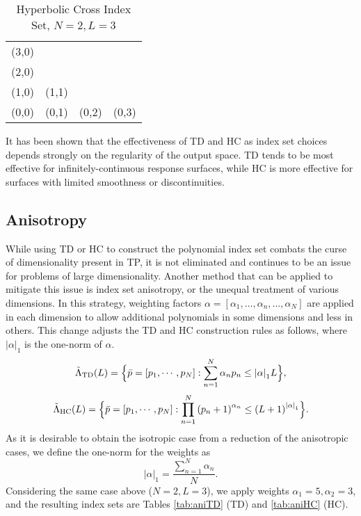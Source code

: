 \begin{table}[h]
  \centering
  \begin{tabular}{c c c c}
    (3,0) &       &       &       \\
    (2,0) &       &       &       \\
    (1,0) & (1,1) &       &       \\
    (0,0) & (0,1) & (0,2) & (0,3)
  \end{tabular}
  \caption{Hyperbolic Cross Index Set, $N=2,L=3$}
  \label{tab:HC}
\end{table}

It has been shown that the effectiveness of TD and HC as index set choices depends strongly on the regularity
of the output space\cite{hctd}.  TD tends to be most effective for infinitely-continuous response surfaces,
while HC is more effective for surfaces with limited smoothness or discontinuities.

\subsection{Anisotropy}
While using TD or HC to construct the polynomial index set combats the curse of dimensionality present in TP,
it is not eliminated and continues to be an issue for problems of large dimensionality.  Another method that can
be applied to mitigate this issue is index set anisotropy, or the unequal treatment of various dimensions.
In this strategy, weighting factors $\alpha=[\alpha_1,\ldots,\alpha_n,\ldots,\alpha_N]$ are applied in each
dimension to allow additional polynomials in some dimensions and less in others.  This change adjusts the TD
and HC construction rules as follows, where $|\alpha|_1$ is the one-norm of $\alpha$.
\begin{equation}
  \tilde\Lambda_\text{TD}(L)=\Big\{\bar p=[p_1,\cdots,p_N]:\sum_{n=1}^N \alpha_n p_n \leq \qty|\mathbf{\alpha}|_1 L
\Big\},
\end{equation}
\begin{equation}
  \tilde\Lambda_\text{HC}(L)=\Big\{\bar p=[p_1,\cdots,p_N]:\prod_{n=1}^N \qty(p_n+1)^{\alpha_n} \leq
  \qty(L+1)^{\qty|\mathbf{\alpha}|_1} \Big\}.
\end{equation}
As it is desirable to obtain the isotropic case from a reduction of the anisotropic cases, we define the
one-norm for the weights as
\begin{equation}
  |\alpha|_1 = \frac{\sum_{n=1}^N \alpha_n}{N}.
\end{equation}
Considering the same case above ($N=2,L=3$), we apply weights $\alpha_1=5,\alpha_2=3$, and the resulting index
sets are Tables \ref{tab:aniTD} (TD) and \ref{tab:aniHC} (HC).

